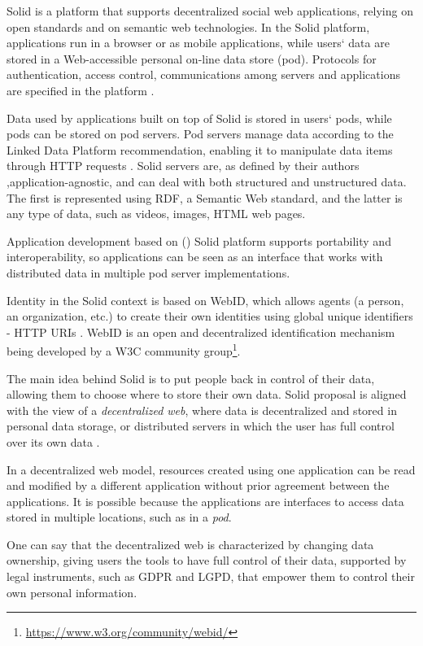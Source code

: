 \documentclass[sigconf]{acmart}
\begin{document}
Solid is a platform that supports decentralized social web applications, relying on open standards and on semantic web technologies. In the Solid platform, applications run in a browser or as mobile applications, while users` data are stored in a Web-accessible personal on-line data store (pod). Protocols for authentication, access control, communications among servers and applications are specified in the platform \cite{Sambra2016}.

Data used by applications built on top of Solid is stored in users` pods, while pods can be stored on pod servers. Pod servers manage data according to the Linked Data Platform recommendation, enabling it to manipulate data items through HTTP requests \cite{LDP}. Solid servers are, as defined by their authors \cite{Sambra2016},\linebreak application-agnostic, and can deal with both structured and unstructured data. The first is represented using RDF, a Semantic Web standard, and the latter is any type of data, such as videos, images, HTML web pages.

Application development based on () Solid platform supports portability and interoperability, so applications can be seen as an interface that works with distributed data in multiple pod server implementations.

Identity in the Solid context is based on WebID, which allows agents (a person, an organization, etc.) to create their own identities using global unique identifiers - HTTP URIs \cite{Sambra2016solid}. WebID is an open and decentralized identification mechanism being developed by a W3C community group\footnote{\url{https://www.w3.org/community/webid/}}.

The main idea behind Solid is to put people back in control of their data, allowing them to choose where to store their own data. Solid proposal is aligned with the view of a \textit{decentralized web}, where data is decentralized and stored in personal data storage, or distributed servers in which the user has full control over its own data \cite{verborgh_iswc_2018}.

In a decentralized web model, resources created using one application can be read and modified by a different application without prior agreement between the applications. It is possible because the applications are interfaces to access data stored in multiple locations, such as in a \textit{pod}.

One can say that the decentralized web is characterized by \linebreak changing data ownership, giving users the tools to have full control of their data, supported by legal instruments, such as GDPR and LGPD, that empower them to control their own personal information.
\end{document}
